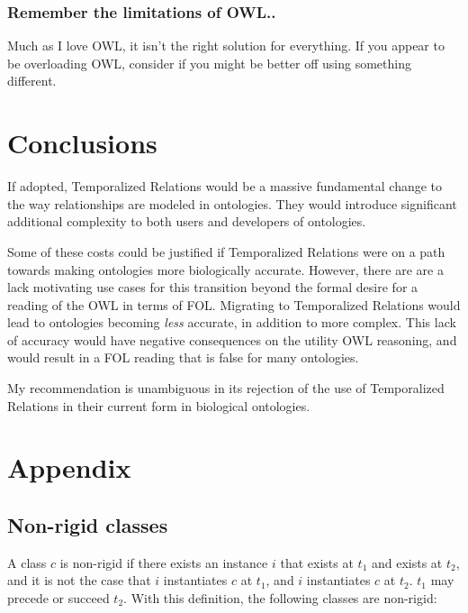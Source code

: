 \documentclass{bioinfo}
\begin{document}
\subsubsection{Remember the limitations of OWL..} Much as I love OWL,
it isn't the right solution for everything. If you appear to be
overloading OWL, consider if you might be better off using something
different.

\section{Conclusions}

If adopted, Temporalized Relations would be a massive fundamental
change to the way relationships are modeled in ontologies. They would
introduce significant additional complexity to both users and
developers of ontologies.

Some of these costs could be justified if Temporalized Relations were
on a path towards making ontologies more biologically
accurate. However, there are are a lack motivating use cases for this
transition beyond the formal desire for a reading of the OWL in terms
of FOL. Migrating to Temporalized Relations would lead to ontologies
becoming \emph{less} accurate, in addition to more complex. This lack
of accuracy would have negative consequences on the utility OWL
reasoning, and would result in a FOL reading that is false for many
ontologies.

My recommendation is unambiguous in its rejection of the use of
Temporalized Relations in their current form in biological ontologies.





\newpage
\section*{Appendix}

\subsection{Non-rigid classes}

A class $c$ is non-rigid if there exists an instance $i$ that exists
at $t_1$ and exists at $t_2$, and it is not the case that $i$
instantiates $c$ at $t_1$, and $i$ instantiates $c$ at $t_2$. $t_1$
may precede or succeed $t_2$. With this definition, the following
classes are non-rigid:
\end{document}
